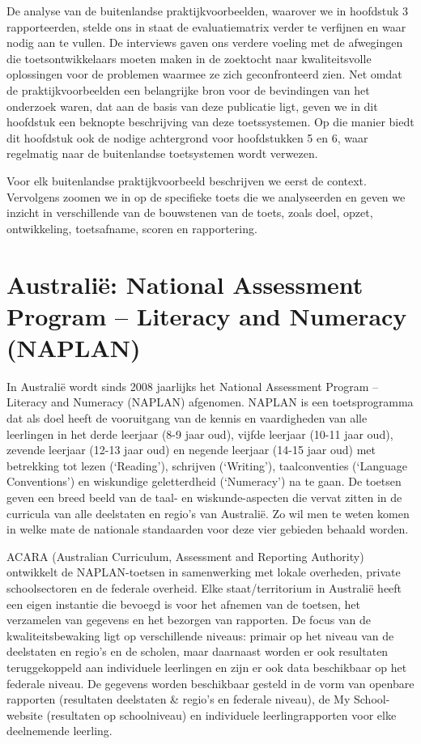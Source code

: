 \documentclass[
  letterpaper,
]{report}
\begin{document}
De analyse van de buitenlandse praktijkvoorbeelden, waarover we in
hoofdstuk 3 rapporteerden, stelde ons in staat de evaluatiematrix verder
te verfijnen en waar nodig aan te vullen. De interviews gaven ons
verdere voeling met de afwegingen die toetsontwikkelaars moeten maken in
de zoektocht naar kwaliteitsvolle oplossingen voor de problemen waarmee
ze zich geconfronteerd zien. Net omdat de praktijkvoorbeelden een
belangrijke bron voor de bevindingen van het onderzoek waren, dat aan de
basis van deze publicatie ligt, geven we in dit hoofdstuk een beknopte
beschrijving van deze toetssystemen. Op die manier biedt dit hoofdstuk
ook de nodige achtergrond voor hoofdstukken 5 en 6, waar regelmatig naar
de buitenlandse toetsystemen wordt verwezen.

Voor elk buitenlandse praktijkvoorbeeld beschrijven we eerst de context.
Vervolgens zoomen we in op de specifieke toets die we analyseerden en
geven we inzicht in verschillende van de bouwstenen van de toets, zoals
doel, opzet, ontwikkeling, toetsafname, scoren en rapportering.

\hypertarget{australiuxeb-national-assessment-program-literacy-and-numeracy-naplan}{%
\section{Australië: National Assessment Program -- Literacy and Numeracy
(NAPLAN)}\label{australiuxeb-national-assessment-program-literacy-and-numeracy-naplan}}

In Australië wordt sinds 2008 jaarlijks het National Assessment Program
-- Literacy and Numeracy (NAPLAN) afgenomen. NAPLAN is een
toetsprogramma dat als doel heeft de vooruitgang van de kennis en
vaardigheden van alle leerlingen in het derde leerjaar (8-9 jaar oud),
vijfde leerjaar (10-11 jaar oud), zevende leerjaar (12-13 jaar oud) en
negende leerjaar (14-15 jaar oud) met betrekking tot lezen (`Reading'),
schrijven (`Writing'), taalconventies (`Language Conventions') en
wiskundige geletterdheid (`Numeracy') na te gaan. De toetsen geven een
breed beeld van de taal- en wiskunde-aspecten die vervat zitten in de
curricula van alle deelstaten en regio's van Australië. Zo wil men te
weten komen in welke mate de nationale standaarden voor deze vier
gebieden behaald worden.

ACARA (Australian Curriculum, Assessment and Reporting Authority)
ontwikkelt de NAPLAN-toetsen in samenwerking met lokale overheden,
private schoolsectoren en de federale overheid. Elke staat/territorium
in Australië heeft een eigen instantie die bevoegd is voor het afnemen
van de toetsen, het verzamelen van gegevens en het bezorgen van
rapporten. De focus van de kwaliteitsbewaking ligt op verschillende
niveaus: primair op het niveau van de deelstaten en regio's en de
scholen, maar daarnaast worden er ook resultaten teruggekoppeld aan
individuele leerlingen en zijn er ook data beschikbaar op het federale
niveau. De gegevens worden beschikbaar gesteld in de vorm van openbare
rapporten (resultaten deelstaten \& regio's en federale niveau), de My
School-website (resultaten op schoolniveau) en individuele
leerlingrapporten voor elke deelnemende leerling.
\end{document}
